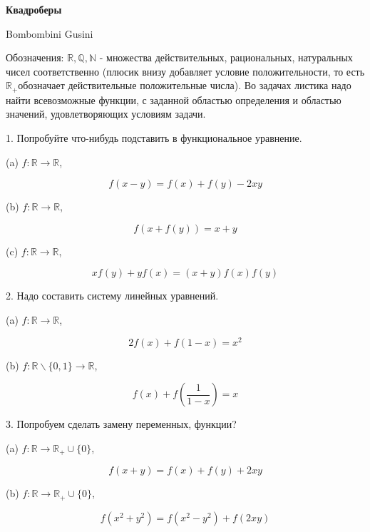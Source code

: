 \centerline{\bf \Huge Квадроберы}

\begin{flushright}
        \scriptsize{Bombombini Gusini}
\end{flushright}

Обозначения: $\mathbb{R}, \mathbb{Q}, \mathbb{N}$ - множества действительных, рациональных, натуральных чисел соответственно (плюсик внизу добавляет условие положительности, то есть $\mathbb{R}_{+}$обозначает действительные положительные числа). Во задачах листика надо найти всевозможные функции, с заданной областью определения и областью значений, удовлетворяющих условиям задачи.

1. Попробуйте что-нибудь подставить в функциональное уравнение.

(a) $f: \mathbb{R} \rightarrow \mathbb{R}$,

$$
f(x-y)=f(x)+f(y)-2 x y
$$

(b) $f: \mathbb{R} \rightarrow \mathbb{R}$,

$$
f(x+f(y))=x+y
$$

(c) $f: \mathbb{R} \rightarrow \mathbb{R}$,

$$
x f(y)+y f(x)=(x+y) f(x) f(y)
$$

2. Надо составить систему линейных уравнений.

(a) $f: \mathbb{R} \rightarrow \mathbb{R}$,

$$
2 f(x)+f(1-x)=x^2
$$

(b) $f: \mathbb{R} \backslash\{0,1\} \rightarrow \mathbb{R}$,

$$
f(x)+f\left(\frac{1}{1-x}\right)=x
$$

3. Попробуем сделать замену переменных, функции?

(a) $f: \mathbb{R} \rightarrow \mathbb{R}_{+} \cup\{0\}$,

$$
f(x+y)=f(x)+f(y)+2 x y
$$

(b) $f: \mathbb{R} \rightarrow \mathbb{R}_{+} \cup\{0\}$,

$$
f\left(x^2+y^2\right)=f\left(x^2-y^2\right)+f(2 x y)
$$
